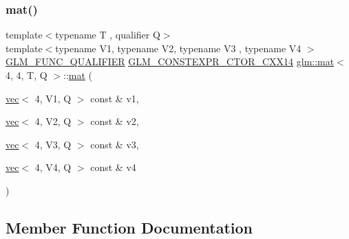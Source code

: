 \mbox{\label{structglm_1_1mat_3_014_00_014_00_01_t_00_01_q_01_4_a64d62a7aac7c48e676c72563f1e4c100}} 
\subsubsection{\texorpdfstring{mat()}{mat()}\hspace{0.1cm}{\footnotesize\ttfamily [21/21]}}
{\footnotesize\ttfamily template$<$typename T , qualifier Q$>$ \\
template$<$typename V1, typename V2, typename V3 , typename V4 $>$ \\
\mbox{\hyperlink{setup_8hpp_a33fdea6f91c5f834105f7415e2a64407}{G\+L\+M\+\_\+\+F\+U\+N\+C\+\_\+\+Q\+U\+A\+L\+I\+F\+I\+ER}} \mbox{\hyperlink{setup_8hpp_a0900f9145e68bf6061b6f5e7be3fa751}{G\+L\+M\+\_\+\+C\+O\+N\+S\+T\+E\+X\+P\+R\+\_\+\+C\+T\+O\+R\+\_\+\+C\+X\+X14}} \mbox{\hyperlink{structglm_1_1mat}{glm\+::mat}}$<$ 4, 4, T, Q $>$\+::\mbox{\hyperlink{structglm_1_1mat}{mat}} (\begin{DoxyParamCaption}\item[{\mbox{\hyperlink{structglm_1_1vec}{vec}}$<$ 4, V1, Q $>$ const \&}]{v1,  }\item[{\mbox{\hyperlink{structglm_1_1vec}{vec}}$<$ 4, V2, Q $>$ const \&}]{v2,  }\item[{\mbox{\hyperlink{structglm_1_1vec}{vec}}$<$ 4, V3, Q $>$ const \&}]{v3,  }\item[{\mbox{\hyperlink{structglm_1_1vec}{vec}}$<$ 4, V4, Q $>$ const \&}]{v4 }\end{DoxyParamCaption})}



\subsection{Member Function Documentation}
\mbox{\label{structglm_1_1mat_3_014_00_014_00_01_t_00_01_q_01_4_a345a0bcf281399c047cb15a6551232b0}} 
